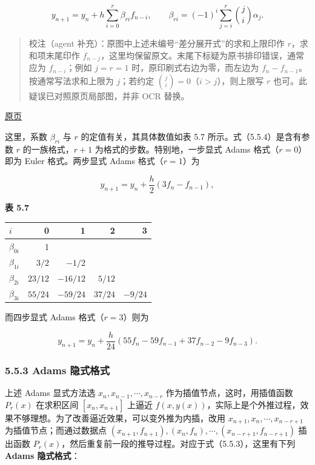 \documentclass[
  10pt,
  fontset=fandol]{ctexart}
\newcounter{none} %
\begin{document}
\[
y_{n+1}=y_n+h\sum_{i=0}^r\beta_{ri}f_{n-i},\qquad
\beta_{ri}=(-1)^i\sum_{j=i}^r\binom ji\alpha_j.
\tag{5.5.4}
\]

\begin{quote}
校注（agent 补充）：原图中上述未编号``差分展开式''的求和上限印作 \(r\)，求和项末尾印作 \(f_{n-j}\)，这里均保留原文。末尾下标疑为原书排印错误，通常应为 \(f_{n-i}\)；例如 \(j=r=1\) 时，原印刷式右边为零，而左边为 \(f_n-f_{n-1}\)。按通常写法求和上限为 \(j\)；若约定 \(\binom ji=0\)（\(i>j\)），则上限写 \(r\) 也可。此疑误已对照原页局部图，并非 OCR 替换。
\end{quote}

\href{../../source-images/pdf-139.jpeg}{原页}

这里，系数 \(\beta_{ri}\) 与 \(r\) 的定值有关，其具体数值如表 5.7 所示。式（5.5.4）是含有参数 \(r\) 的一族格式，\(r+1\) 为格式的步数。特别地，一步显式 Adams 格式（\(r=0\)）即为 Euler 格式。两步显式 Adams 格式（\(r=1\)）为

\[
y_{n+1}=y_n+\frac h2(3f_n-f_{n-1}),
\tag{5.5.5}
\]

\textbf{表 5.7}

{\def\LTcaptype{none} %
\begin{longtable}[]{@{}lrrrr@{}}
\toprule\noalign{}
\(i\) & 0 & 1 & 2 & 3 \\
\midrule\noalign{}
\endhead
\bottomrule\noalign{}
\endlastfoot
\(\beta_{0i}\) & 1 & & & \\
\(\beta_{1i}\) & \(3/2\) & \(-1/2\) & & \\
\(\beta_{2i}\) & \(23/12\) & \(-16/12\) & \(5/12\) & \\
\(\beta_{3i}\) & \(55/24\) & \(-59/24\) & \(37/24\) & \(-9/24\) \\
\end{longtable}
}

而四步显式 Adams 格式（\(r=3\)）则为

\[
y_{n+1}=y_n+\frac h{24}(55f_n-59f_{n-1}+37f_{n-2}-9f_{n-3}).
\tag{5.5.6}
\]

\subsubsection{5.5.3 Adams 隐式格式}\label{adams-ux9690ux5f0fux683cux5f0f}

上述 Adams 显式方法选 \(x_n,x_{n-1},\cdots,x_{n-r}\) 作为插值节点，这时，用插值函数 \(P_r(x)\) 在求积区间 \([x_n,x_{n+1}]\) 上逼近 \(f(x,y(x))\)，实际上是个外推过程，效果不够理想。为了改善逼近效果，可以变外推为内插，改用 \(x_{n+1},x_n,\cdots,x_{n-r+1}\) 为插值节点；而通过数据点 \((x_{n+1},\allowbreak f_{n+1}),\allowbreak (x_n,\allowbreak f_n),\allowbreak \cdots,\allowbreak (x_{n-r+1},\allowbreak f_{n-r+1})\) 插出函数 \(P_r(x)\)，然后重复前一段的推导过程。对应于式（5.5.3），这里有下列 \textbf{Adams 隐式格式}：
\end{document}
